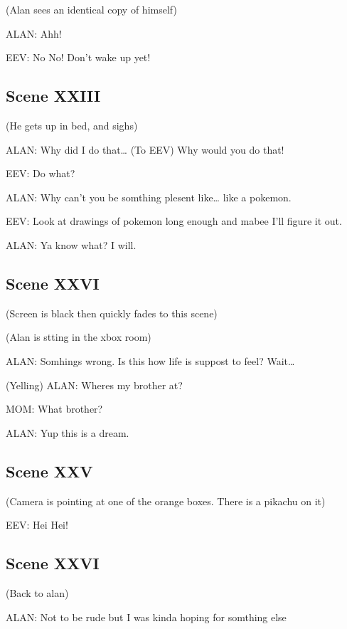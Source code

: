 \documentclass{article}
\begin{document}
(Alan sees an identical copy of himself)

\noindent
ALAN: Ahh!

\noindent
EEV: No No! Don't wake up yet!

\subsection[023 - XXIII]{Scene XXIII}

(He gets up in bed, and sighs)

\noindent
ALAN: Why did I do that\ldots{} (To EEV) Why would you do that!

\noindent
EEV: Do what?

\noindent
ALAN: Why can't you be somthing plesent like\ldots{} like a pokemon.

\noindent
EEV: Look at drawings of pokemon long enough and mabee I'll figure it out.

\noindent
ALAN: Ya know what? I will.

\subsection[024 - XXVI]{Scene XXVI}

(Screen is black then quickly fades to this scene)

(Alan is stting in the xbox room)

\noindent
ALAN: Somhings wrong. Is this how life is suppost to feel? Wait\ldots{}

\noindent
(Yelling)
ALAN: Wheres my brother at?

\noindent
MOM: What brother?

\noindnent
ALAN: Yup this is a dream.

\subsection[025 - XXV]{Scene XXV}

(Camera is pointing at one of the orange boxes. There is a pikachu on it)

EEV: Hei Hei!

\subsection[026 - XXVI]{Scene XXVI}

(Back to alan)

\noindent
ALAN: Not to be rude but I was kinda hoping for somthing else
\end{document}
